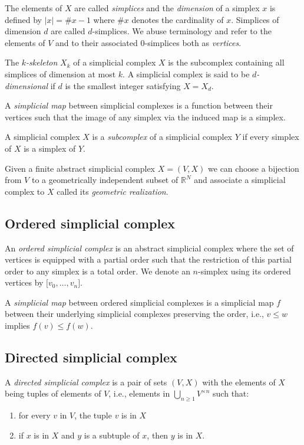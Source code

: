 \documentclass{amsart}
\begin{document}
	The elements of $X$ are called \textit{simplices} and the \textit{dimension} of a simplex $x$ is defined by $|x| = \# x - 1$ where $\# x$ denotes the cardinality of $x$. Simplices of dimension $d$ are called $d$-simplices. We abuse terminology and refer to the elements of $V$ and to their associated $0$-simplices both as \textit{vertices}.
	
	The $k$\textit{-skeleton} $X_k$ of a simplicial complex $X$ is the subcomplex containing all simplices of dimension at most $k$. A simplicial complex is said to be $d$\textit{-dimensional} if $d$ is the smallest integer satisfying $X = X_d$.
	
	A \textit{simplicial map} between simplicial complexes is a function between their vertices such that the image of any simplex via the induced map is a simplex.
	
	A simplicial complex $X$ is a \textit{subcomplex} of a simplicial complex $Y$ if every simplex of $X$ is a simplex of $Y$.
	
	Given a finite abstract simplicial complex $X = (V, X)$ we can choose a bijection from $V$ to a geometrically independent subset of $\mathbb R^N$ and associate a
	simplicial complex
	to $X$ called its \textit{geometric realization}.
	
	\subsection*{Ordered simplicial complex}
	\label{ordered_simplical_complex}
	
	An \textit{ordered simplicial complex} is an 
	abstract simplicial complex where the set of vertices is equipped with a partial order such that the restriction of this partial order to any simplex is a total order. We denote an $n$-simplex using its ordered vertices by $\lbrack v_0, \dots, v_n \rbrack$.
	
	A \textit{simplicial map} between ordered simplicial complexes is a simplicial map $f$ between their underlying simplicial complexes preserving the order, i.e., $v \leq w$ implies $f(v) \leq f(w)$.
	
	\subsection*{Directed simplicial complex} \label{directed_simplicial_complex}
	
	A \textit{directed simplicial complex} is a pair of sets $(V, X)$ with the elements of $X$ being tuples of elements of $V$, i.e., elements in $\bigcup_{n\geq1} V^{\times n}$ such that: 
	\begin{enumerate}
		\item for every $v$ in $V$, the tuple $v$ is in $X$
		\item if $x$ is in $X$ and $y$ is a subtuple of $x$, then $y$ is in $X$. 
	\end{enumerate}
	
\end{document}
